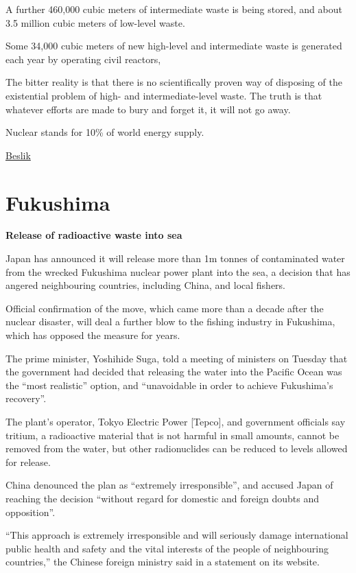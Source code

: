 \documentclass[
]{book}
\begin{document}
A further 460,000 cubic meters of intermediate waste is being stored, and about 3.5 million cubic meters of low-level waste.

Some 34,000 cubic meters of new high-level and intermediate waste is generated each year by operating civil reactors,

The bitter reality is that there is no scientifically proven way of disposing of the existential problem of high- and intermediate-level waste.
The truth is that whatever efforts are made to bury and forget it, it will not go away.

Nuclear stands for 10\% of world energy supply.

\href{https://esgonasunday.substack.com/p/week-16-is-nuclear-part-of-our-sustainable}{Beslik}

\hypertarget{fukushima}{%
\section{Fukushima}\label{fukushima}}

\textbf{Release of radioactive waste into sea}

Japan has announced it will release more than 1m tonnes of contaminated water from the wrecked Fukushima nuclear power plant into the sea, a decision that has angered neighbouring countries, including China, and local fishers.

Official confirmation of the move, which came more than a decade after the nuclear disaster, will deal a further blow to the fishing industry in Fukushima, which has opposed the measure for years.

The prime minister, Yoshihide Suga, told a meeting of ministers on Tuesday that the government had decided that releasing the water into the Pacific Ocean was the ``most realistic'' option, and ``unavoidable in order to achieve Fukushima's recovery''.

The plant's operator, Tokyo Electric Power {[}Tepco{]}, and government officials say tritium, a radioactive material that is not harmful in small amounts, cannot be removed from the water, but other radionuclides can be reduced to levels allowed for release.

China denounced the plan as ``extremely irresponsible'', and accused Japan of reaching the decision ``without regard for domestic and foreign doubts and opposition''.

``This approach is extremely irresponsible and will seriously damage international public health and safety and the vital interests of the people of neighbouring countries,'' the Chinese foreign ministry said in a statement on its website.
\end{document}
